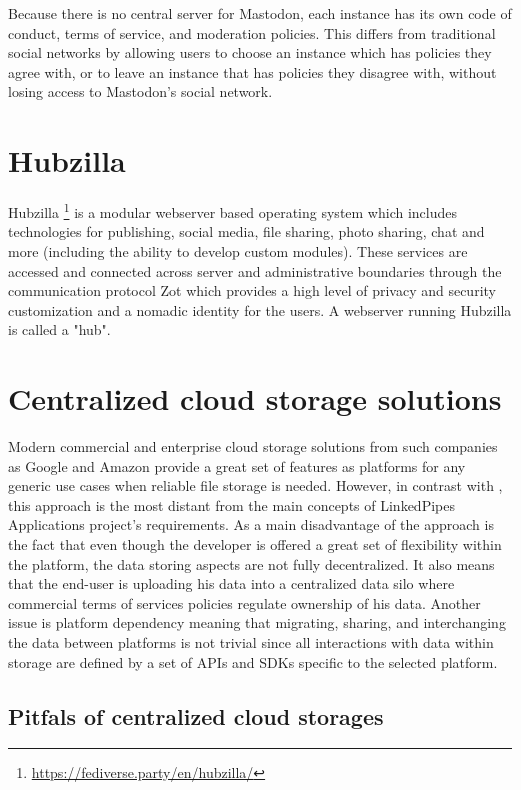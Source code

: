 Because there is no central server for Mastodon, each instance has its own code of conduct, terms of service, and moderation policies. This differs from traditional social networks by allowing users to choose an instance which has policies they agree with, or to leave an instance that has policies they disagree with, without losing access to Mastodon's social network.

\section{Hubzilla}

Hubzilla \footnote{\url{https://fediverse.party/en/hubzilla/}} is a modular webserver based operating system which includes technologies for publishing, social media, file sharing, photo sharing, chat and more (including the ability to develop custom modules). These services are accessed and connected across server and administrative boundaries through the communication protocol Zot which provides a high level of privacy and security customization and a nomadic identity for the users. A webserver running Hubzilla is called a "hub".

\section{Centralized cloud storage solutions}

Modern commercial and enterprise cloud storage solutions from such companies as Google and Amazon provide a great set of features as platforms for any generic use cases when reliable file storage is needed. However, in contrast with \solid{}, this approach is the most distant from the main concepts of LinkedPipes Applications project’s requirements. As a main disadvantage of the approach is the fact that even though the developer is offered a great set of flexibility within the platform, the data storing aspects are not fully decentralized. It also means that the end-user is uploading his data into a centralized data silo where commercial terms of services policies regulate ownership of his data. Another issue is platform dependency meaning that migrating, sharing, and interchanging the data between platforms is not trivial since all interactions with data within storage are defined by a set of APIs and SDKs specific to the selected platform. 

\subsection{Pitfals of centralized cloud storages}

